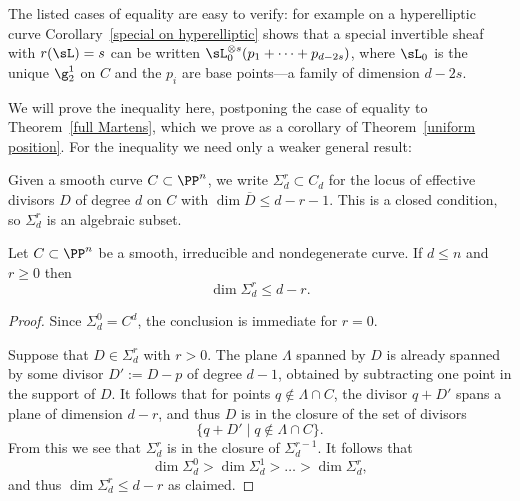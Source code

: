 The listed cases of equality are easy to verify: for example on a hyperelliptic curve Corollary~\ref{special on hyperelliptic} shows that a special invertible sheaf with  $r(\sL) = s$ can be written $\sL_0^{\otimes s}(p_1+\cdots + p_{d-2s})$, where
$\sL_0$ is the unique $\g^1_2$ on $C$ and the $p_i$ are base points---a family of dimension $d-2s$.

We will prove the inequality here, postponing the case of equality to Theorem~\ref{full Martens}, which we prove as a corollary of Theorem~\ref{uniform position}. For the inequality we need only a weaker general result:

Given 
a smooth curve $C \subset \PP^n$, we write $\Sigma^r_d \subset C_d$ for the locus of effective divisors $D$ of degree $d$ on $C$ with $\dim \overline D \leq d-r-1$. This is a closed condition, so
$\Sigma^r_d$ is an algebraic subset.

\begin{lemma}\label{elementary secant plane lemma}
Let $C \subset \PP^n$ be a smooth, irreducible and nondegenerate curve. If $d \leq n$ and $r \geq 0$ then
$$
\dim \Sigma^r_d \leq d-r.
$$
\end{lemma}

\begin{proof}
Since $\Sigma^0_d = C^d$, the conclusion is immediate for $r=0$.

Suppose that  $D\in \Sigma^r_d$ with $r>0$. The plane
$\Lambda$ spanned by $D$ is already spanned by some divisor  $D' := D -p$ of degree $d-1$, 
obtained by subtracting one point  in the support of $D$.
It follows that for points $q\notin \Lambda \cap C$, the divisor $q+D'$ spans a plane of dimension $d-r$, and thus $D$ is in the closure of the set of divisors
$$
\{q+D' \mid q\notin \Lambda \cap C \}.
$$
From this we see that $\Sigma^r_d$ is in the closure of  $\Sigma^{r-1}_d$. It follows that 
$$
\dim \Sigma^0_d >  \dim \Sigma^1_d > \dots > \dim \Sigma^r_d,
$$ 
and thus $\dim \Sigma^r_d \leq d-r$ as claimed.
\end{proof}


